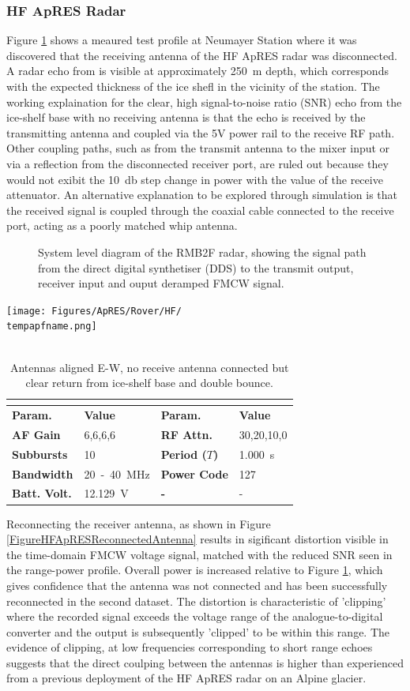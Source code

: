 \documentclass[a4paper,12pt]{article}
\newcommand{\apresdoc}[9]{
    \def\tempapfname{#1}
    \def\tempaploc{#2}
    \def\tempapcom{#3}
    \def\temptimestamp{#4}
    \def\tempafgain{#5}
    \def\temprfattn{#6}
    \def\tempperiod{#7}
    \def\tempflow{#8}
    \def\tempfupp{#9}
    \apresdoccont
}
\newcommand{\apresdoccont}[6]{
  \def\tempnatt{#1}
  \def\tempnchirp{#2}
  \def\tempnsubburst{#3}
  \def\temppowercode{#4}
  \def\tempbattvolt{#5}
  \def\tempaplbl{#6}

  \begin{table}
    \caption{\tempapcom}
    \rowcolors{2}{gray!25}{white}
    \centering
    \texttt{[image: Figures/ApRES/Rover/HF/\\tempapfname.png]}
    \\
    ~\\
    \begin{tabular}{>{\bfseries}l l >{\bfseries}l l}
      \hline
      \rowcolor{gray!50}
      \multicolumn{4}{c}{\textbf{Filename} \tempapfname} \\
      \hline
      Param. & \bfseries Value & Param. & \bfseries Value \\
      AF Gain & \tempafgain &
      RF Attn. & \temprfattn \\
      Subbursts & \tempnsubburst &
      Period ($T$) & \tempperiod~s \\
      Bandwidth & \tempflow~-~\tempfupp~MHz &
      Power Code & \temppowercode \\
      Batt. Volt. & \tempbattvolt~V &
      - & - \\
      \hline
    \end{tabular}
    \label{\tempaplbl}
  \end{table}
}
\begin{document}
\subsubsection*{HF ApRES Radar}
Figure \ref{FigureHFApRESNoReceiveAntenna} shows a meaured test profile at
Neumayer Station where it was discovered that the receiving antenna of the HF
ApRES radar was disconnected.  A radar echo from is visible at approximately 
\SI{250}{\metre} depth, which corresponds with the expected thickness of the ice
shefl in the vicinity of the station.  The working explaination for the clear,
high signal-to-noise ratio (SNR) echo from the ice-shelf base with no receiving
antenna is that the echo is received by the transmitting antenna and coupled via
the 5V power rail to the receive RF path.  Other coupling paths, such as from the
transmit antenna to the mixer input or via a reflection from the disconnected
receiver port, are ruled out because they would not exibit the \SI{10}{\decibel}
step change in power with the value of the receive attenuator.  An alternative
explanation to be explored through simulation is that the received signal is
coupled through the coaxial cable connected to the receive port, acting as a
poorly matched whip antenna.

\begin{figure}[h]
  \centering
  
  \caption{
    System level diagram of the RMB2F radar, showing the signal path from the
    direct digital synthetiser (DDS) to the transmit output, receiver input and
    ouput deramped FMCW signal.}
  \label{FigureHFApRESRadarArchitecture}
\end{figure}

\apresdoc
{2021-12-28-213752.dat}
{Neumayer III}
{Antennas aligned E-W, no receive antenna connected but clear return from
ice-shelf base and double bounce.}
{2021-12-28 21:37:53.000}
{6,6,6,6}
{30,20,10,0}
{1.000}
{20}
{40}
{4}
{40}
{10}
{127}
{12.129}
{FigureHFApRESNoReceiveAntenna}

Reconnecting the receiver antenna, as shown in Figure
\ref{FigureHFApRESReconnectedAntenna} results in sigificant distortion visible
in the time-domain FMCW voltage signal, matched with the reduced SNR seen in the
range-power profile.  Overall power is increased relative to Figure
\ref{FigureHFApRESNoReceiveAntenna}, which gives confidence that the antenna was
not connected and has been successfully reconnected in the second dataset.  The
distortion is characteristic of 'clipping' where the recorded signal exceeds the
voltage range of the analogue-to-digital converter and the output is
subsequently 'clipped' to be within this range.  The evidence of clipping, at
low frequencies corresponding to short range echoes suggests that the direct
coulping between the antennas is higher than experienced from a previous
deployment of the HF ApRES radar on an Alpine glacier. 
\end{document}
